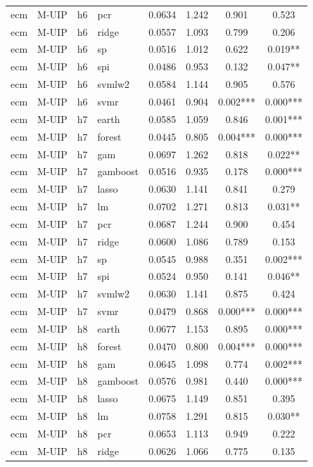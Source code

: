 \begin{ThreePartTable}
\begin{longtable}[t]{llclcccc}
ecm & M-UIP & h6 & pcr & 0.0634 & 1.242 & 0.901 & 0.523\\
ecm & M-UIP & h6 & ridge & 0.0557 & 1.093 & 0.799 & 0.206\\
ecm & M-UIP & h6 & sp & 0.0516 & 1.012 & 0.622 & 0.019**\\
ecm & M-UIP & h6 & spi & 0.0486 & 0.953 & 0.132 & 0.047**\\
ecm & M-UIP & h6 & svmlw2 & 0.0584 & 1.144 & 0.905 & 0.576\\
ecm & M-UIP & h6 & svmr & 0.0461 & 0.904 & 0.002*** & 0.000***\\
\addlinespace
ecm & M-UIP & h7 & earth & 0.0585 & 1.059 & 0.846 & 0.001***\\
ecm & M-UIP & h7 & forest & 0.0445 & 0.805 & 0.004*** & 0.000***\\
ecm & M-UIP & h7 & gam & 0.0697 & 1.262 & 0.818 & 0.022**\\
ecm & M-UIP & h7 & gamboost & 0.0516 & 0.935 & 0.178 & 0.000***\\
ecm & M-UIP & h7 & lasso & 0.0630 & 1.141 & 0.841 & 0.279\\
ecm & M-UIP & h7 & lm & 0.0702 & 1.271 & 0.813 & 0.031**\\
ecm & M-UIP & h7 & pcr & 0.0687 & 1.244 & 0.900 & 0.454\\
ecm & M-UIP & h7 & ridge & 0.0600 & 1.086 & 0.789 & 0.153\\
ecm & M-UIP & h7 & sp & 0.0545 & 0.988 & 0.351 & 0.002***\\
ecm & M-UIP & h7 & spi & 0.0524 & 0.950 & 0.141 & 0.046**\\
ecm & M-UIP & h7 & svmlw2 & 0.0630 & 1.141 & 0.875 & 0.424\\
ecm & M-UIP & h7 & svmr & 0.0479 & 0.868 & 0.000*** & 0.000***\\
\addlinespace
ecm & M-UIP & h8 & earth & 0.0677 & 1.153 & 0.895 & 0.000***\\
ecm & M-UIP & h8 & forest & 0.0470 & 0.800 & 0.004*** & 0.000***\\
ecm & M-UIP & h8 & gam & 0.0645 & 1.098 & 0.774 & 0.002***\\
ecm & M-UIP & h8 & gamboost & 0.0576 & 0.981 & 0.440 & 0.000***\\
ecm & M-UIP & h8 & lasso & 0.0675 & 1.149 & 0.851 & 0.395\\
ecm & M-UIP & h8 & lm & 0.0758 & 1.291 & 0.815 & 0.030**\\
ecm & M-UIP & h8 & pcr & 0.0653 & 1.113 & 0.949 & 0.222\\
ecm & M-UIP & h8 & ridge & 0.0626 & 1.066 & 0.775 & 0.135\\

\end{longtable}
\end{ThreePartTable}
